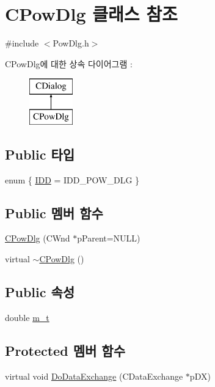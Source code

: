 \hypertarget{class_c_pow_dlg}{\section{C\-Pow\-Dlg 클래스 참조}
\label{class_c_pow_dlg}
}


{\ttfamily \#include $<$Pow\-Dlg.\-h$>$}

C\-Pow\-Dlg에 대한 상속 다이어그램 \-: \begin{figure}[H]
\begin{center}
\leavevmode
\includegraphics[height=2.000000cm]{class_c_pow_dlg}
\end{center}
\end{figure}
\subsection*{Public 타입}
\begin{DoxyCompactItemize}
\item 
enum \{ \hyperlink{class_c_pow_dlg_a683a28f8cb6129b2d9f1a8b992832120ac1b1f511a60bab7cfaa28eba3c6a15e5}{I\-D\-D} = I\-D\-D\-\_\-\-P\-O\-W\-\_\-\-D\-L\-G
 \}
\end{DoxyCompactItemize}
\subsection*{Public 멤버 함수}
\begin{DoxyCompactItemize}
\item 
\hyperlink{class_c_pow_dlg_ae9a905bda1e55e4ca19b1a47032f74a4}{C\-Pow\-Dlg} (C\-Wnd $\ast$p\-Parent=N\-U\-L\-L)
\item 
virtual \hyperlink{class_c_pow_dlg_adfea03ae30c4fe603b1e8f762f5d1753}{$\sim$\-C\-Pow\-Dlg} ()
\end{DoxyCompactItemize}
\subsection*{Public 속성}
\begin{DoxyCompactItemize}
\item 
double \hyperlink{class_c_pow_dlg_a62c895a66edd34c933bbe99371ca1ecf}{m\-\_\-t}
\end{DoxyCompactItemize}
\subsection*{Protected 멤버 함수}
\begin{DoxyCompactItemize}
\item 
virtual void \hyperlink{class_c_pow_dlg_ae14602a28d4e977498508f5c6212bc57}{Do\-Data\-Exchange} (C\-Data\-Exchange $\ast$p\-D\-X)
\end{DoxyCompactItemize}


